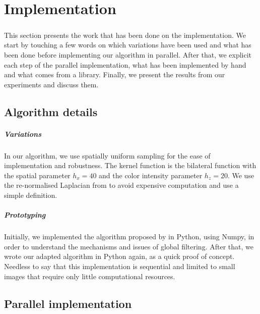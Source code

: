 \chapter{Implementation}

\paragraph{}
This section presents the work that has been done on the implementation.
We start by touching a few words on which variations have been used and what has been done before implementing our algorithm in parallel.
After that, we explicit each step of the parallel implementation, what has been implemented by hand and what comes from a library.
Finally, we present the results from our experiments and discuss them.

\section{Algorithm details}

\paragraph{Variations}
In our algorithm, we use spatially uniform sampling for the ease of implementation and robustness.
The kernel function is the bilateral function with the spatial parameter \(h_x = 40\) and the color intensity parameter \(h_z = 20\).
We use the re-normalised Laplacian from \cite{milanfar_new_2016} to avoid expensive computation and use a simple definition.

\paragraph{Prototyping}
Initially, we implemented the algorithm proposed by \cite{glide_2014} in Python, using Numpy, in order to understand the mechanisms and issues of global filtering.
After that, we wrote our adapted algorithm in Python again, as a quick proof of concept.
Needless to say that this implementation is sequential and limited to small images that require only little computational resources.

\section{Parallel implementation}

